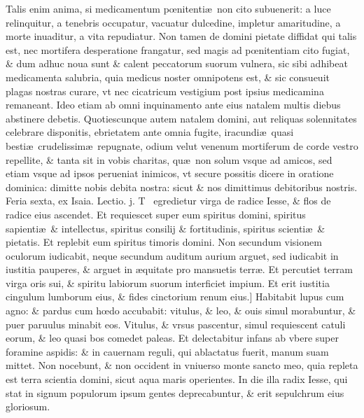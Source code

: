 \documentclass[a5paper,10pt]{book}
\def\ae{æ}
\def\oe{œ}
\begin{document}
\begin{multicols*}{2}
Talis enim anima, si medicamentum p\oe nitenti\ae \ non cito subuenerit: a luce relinquitur, a tenebris occupatur, vacuatur dulcedine, impletur amaritudine, a morte inuaditur, a vita repudiatur.
Non tamen de domini pietate diffidat qui talis est, nec mortifera desperatione frangatur, sed magis ad p\oe nitentiam cito fugiat, \& dum adhuc noua sunt \& calent peccatorum suorum vulnera, sic sibi adhibeat medicamenta salubria, quia medicus noster omnipotens est, \& sic consueuit plagas nostras curare, vt nec cicatricum vestigium post ipsius medicamina remaneant.
Ideo etiam ab omni inquinamento ante eius natalem multis diebus abstinere debetis.
\newline Quotiescunque autem natalem domini, aut reliquas solennitates
celebrare disponitis, ebrietatem ante omnia fugite, iracundi\ae \ quasi besti\ae \ crudelissim\ae \ repugnate, odium velut venenum mortiferum de corde vestro repellite, \& tanta sit in vobis charitas, qu\ae \ non solum vsque ad amicos, sed etiam vsque ad ipsos perueniat inimicos, vt secure possitis dicere in oratione dominica: dimitte nobis debita nostra: sicut \& nos dimittimus debitoribus nostris.
\newline {} \color{red} \hypertarget{FRI-PRIMA-ADV}{Feria sexta,} ex Isaia. \hfill Lectio. j. \color{black}
\vspace{-.5em}
T \textdagger \ egredietur virga de radice Iesse, \& flos de radice eius ascendet.
Et requiescet super eum spiritus domini, spiritus sapienti\ae \ \& intellectus, spiritus consilij \& fortitudinis, spiritus scienti\ae \ \& pietatis. Et replebit eum spiritus timoris domini.
Non secundum visionem oculorum iudicabit, neque secundum auditum aurium arguet, sed iudicabit in iustitia pauperes, \& arguet in \ae quitate pro mansuetis terr\ae .
Et percutiet terram virga oris sui, \& spiritu labiorum suorum interficiet impium. Et erit iustitia cingulum lumborum eius, \& fides cinctorium renum eius.]
Habitabit lupus cum agno: \& pardus cum h\oe do accubabit: vitulus, \& leo, \& ouis simul morabuntur, \& puer paruulus minabit eos.
Vitulus, \& vrsus pascentur, simul requiescent catuli eorum, \& leo quasi bos comedet paleas.
Et delectabitur infans ab vbere super foramine aspidis: \& in cauernam reguli, qui ablactatus fuerit, manum suam mittet.
Non nocebunt, \& non occident in vniuerso monte sancto meo, quia repleta est terra scientia domini, sicut aqua maris operientes.
In die illa radix Iesse, qui stat in signum populorum ipsum gentes deprecabuntur, \& erit sepulchrum eius gloriosum.

\end{multicols*}
\end{document}
